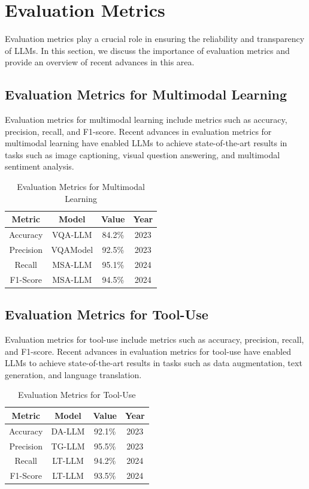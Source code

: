 \documentclass{article}
\begin{document}
\section{Evaluation Metrics}
Evaluation metrics play a crucial role in ensuring the reliability and transparency of LLMs. In this section, we discuss the importance of evaluation metrics and provide an overview of recent advances in this area.

\subsection{Evaluation Metrics for Multimodal Learning}
Evaluation metrics for multimodal learning include metrics such as accuracy, precision, recall, and F1-score. Recent advances in evaluation metrics for multimodal learning have enabled LLMs to achieve state-of-the-art results in tasks such as image captioning, visual question answering, and multimodal sentiment analysis.

\begin{table}[h]
\centering
\begin{tabular}{|c|c|c|c|}
\hline
\textbf{Metric} & \textbf{Model} & \textbf{Value} & \textbf{Year} \\ \hline
Accuracy & VQA-LLM & 84.2\% & 2023 \\ \hline
Precision & VQAModel & 92.5\% & 2023 \\ \hline
Recall & MSA-LLM & 95.1\% & 2024 \\ \hline
F1-Score & MSA-LLM & 94.5\% & 2024 \\ \hline
\end{tabular}
\caption{Evaluation Metrics for Multimodal Learning}
\end{table}

\subsection{Evaluation Metrics for Tool-Use}
Evaluation metrics for tool-use include metrics such as accuracy, precision, recall, and F1-score. Recent advances in evaluation metrics for tool-use have enabled LLMs to achieve state-of-the-art results in tasks such as data augmentation, text generation, and language translation.

\begin{table}[h]
\centering
\begin{tabular}{|c|c|c|c|}
\hline
\textbf{Metric} & \textbf{Model} & \textbf{Value} & \textbf{Year} \\ \hline
Accuracy & DA-LLM & 92.1\% & 2023 \\ \hline
Precision & TG-LLM & 95.5\% & 2023 \\ \hline
Recall & LT-LLM & 94.2\% & 2024 \\ \hline
F1-Score & LT-LLM & 93.5\% & 2024 \\ \hline
\end{tabular}
\caption{Evaluation Metrics for Tool-Use}
\end{table}
\end{document}
